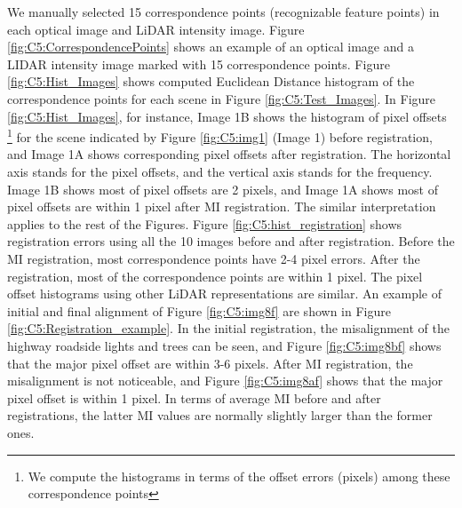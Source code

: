 We manually selected 15 correspondence points (recognizable feature points) in each optical image and LiDAR intensity image. Figure \ref{fig:C5:CorrespondencePoints} shows an example of an optical image and a LIDAR intensity image marked with 15 correspondence points. Figure \ref{fig:C5:Hist_Images} shows computed Euclidean Distance histogram of the correspondence points for each scene in Figure \ref{fig:C5:Test_Images}. In Figure \ref{fig:C5:Hist_Images}, for instance, Image 1B shows the histogram of pixel offsets \footnote{We compute the histograms in terms of the offset errors (pixels) among these correspondence points} for the scene indicated by Figure \ref{fig:C5:img1} (Image 1) before registration, and Image 1A shows corresponding pixel offsets after registration. The horizontal axis stands for the pixel offsets, and the vertical axis stands for the frequency. Image 1B shows most of pixel offsets are 2 pixels, and Image 1A shows most of pixel offsets are within 1 pixel after MI registration. The similar interpretation applies to the rest of the Figures. Figure \ref {fig:C5:hist_registration} shows registration errors using all the 10 images before and after registration. Before the MI registration, most correspondence points have 2-4 pixel errors. After the registration, most of the correspondence points are within 1 pixel. The pixel offset histograms using other LiDAR representations are similar. An example of initial and final alignment of Figure \ref{fig:C5:img8f} are shown in Figure \ref{fig:C5:Registration_example}. In the initial registration, the misalignment of the highway roadside lights and trees can be seen, and Figure \ref{fig:C5:img8bf} shows that the major pixel offset are within 3-6 pixels. After MI registration, the misalignment is not noticeable, and Figure \ref{fig:C5:img8af} shows that the major pixel offset is within 1 pixel. In terms of average MI before and after registrations, the latter MI values are normally slightly larger than the former ones. 


